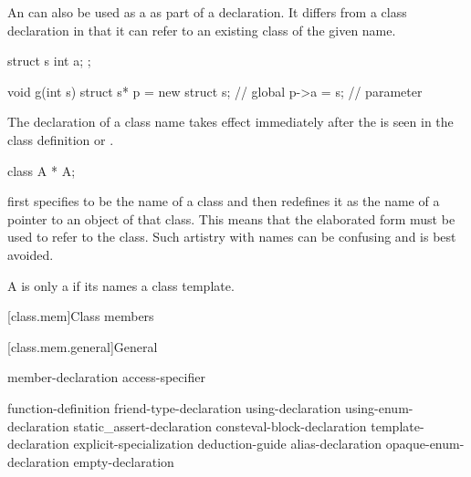 \pnum
{}%
%
\begin{note}
An  can also
be used as a  as part of a declaration. It
differs from a class declaration in that it can refer to
an existing class of the given name.
\end{note}
\begin{example}
\begin{codeblock}
struct s { int a; };

void g(int s) {
  struct s* p = new struct s;   // global 
  p->a = s;                     // parameter 
}
\end{codeblock}
\end{example}

\pnum
{}%
\begin{note}
The declaration of a class name takes effect immediately after the
 is seen in the class definition or
.
\begin{example}
\begin{codeblock}
class A * A;
\end{codeblock}
first specifies  to be the name of a class and then redefines
it as the name of a pointer to an object of that class. This means that
the elaborated form   must be used to refer to the
class. Such artistry with names can be confusing and is best avoided.
\end{example}
\end{note}

\pnum
{}%
A  is only a 
if its  names a class template.

[class.mem]{Class members}%

[class.mem.general]{General}%
%

\begin{bnf}
\br
    member-declaration \br
    access-specifier \terminal{:} 
\end{bnf}

\begin{bnf}
\br
       \terminal{;}\br
    function-definition\br
    friend-type-declaration\br
    using-declaration\br
    using-enum-declaration\br
    static_assert-declaration\br
    consteval-block-declaration\br
    template-declaration\br
    explicit-specialization\br
    deduction-guide\br
    alias-declaration\br
    opaque-enum-declaration\br
    empty-declaration
\end{bnf}

